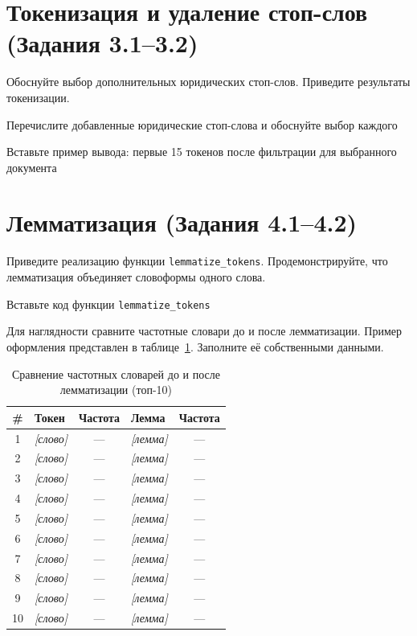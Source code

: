 \documentclass[12pt, a4paper]{report}
\newcommand{\placeholder}[2][Вставьте результат]{%
  \begin{tcolorbox}[placeholderbox, title={#2}]
    #1
  \end{tcolorbox}%
  \vspace{4pt}%
}
\begin{document}
\section{Токенизация и удаление стоп-слов (Задания 3.1–3.2)}

Обоснуйте выбор дополнительных юридических стоп-слов. Приведите результаты токенизации.

\placeholder[Перечислите добавленные юридические стоп-слова и обоснуйте выбор каждого]{Дополнительные юридические стоп-слова}

\placeholder[Вставьте пример вывода: первые 15 токенов после фильтрации для выбранного документа]{Пример токенизации}

\section{Лемматизация (Задания 4.1–4.2)}

Приведите реализацию функции \texttt{lemmatize\_tokens}. Продемонстрируйте, что
лемматизация объединяет словоформы одного слова.

\placeholder[Вставьте код функции \texttt{lemmatize\_tokens}]{Реализация функции лемматизации}

Для наглядности сравните частотные словари до и после лемматизации. Пример оформления
представлен в таблице~\ref{tab:lemma_compare}. Заполните её собственными данными.

\begin{table}[h]
  \centering
  \caption{Сравнение частотных словарей до и после лемматизации (топ-10)}
  \label{tab:lemma_compare}
  \begin{tabularx}{0.9\textwidth}{c X c X c}
    \toprule
    \rowcolor{LightBlue}
    \textsf{\textbf{\#}} &
    \textsf{\textbf{Токен}} &
    \textsf{\textbf{Частота}} &
    \textsf{\textbf{Лемма}} &
    \textsf{\textbf{Частота}} \\
    \midrule
    1  & \textit{[слово]} & — & \textit{[лемма]} & — \\
    2  & \textit{[слово]} & — & \textit{[лемма]} & — \\
    3  & \textit{[слово]} & — & \textit{[лемма]} & — \\
    4  & \textit{[слово]} & — & \textit{[лемма]} & — \\
    5  & \textit{[слово]} & — & \textit{[лемма]} & — \\
    6  & \textit{[слово]} & — & \textit{[лемма]} & — \\
    7  & \textit{[слово]} & — & \textit{[лемма]} & — \\
    8  & \textit{[слово]} & — & \textit{[лемма]} & — \\
    9  & \textit{[слово]} & — & \textit{[лемма]} & — \\
    10 & \textit{[слово]} & — & \textit{[лемма]} & — \\
    \bottomrule
  \end{tabularx}
\end{table}
\end{document}

